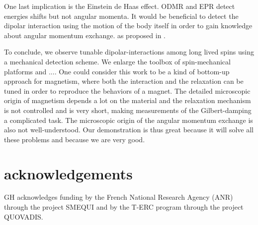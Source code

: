 \documentclass[preprintnumbers,amsmath,amssymb,superscriptaddress,twocolumn,showpacs]{revtex4-1}
\begin{document}
One last implication is the Einstein de Haas effect.
ODMR and EPR detect energies shifts but not angular momenta. 
It would be beneficial to detect the dipolar interaction using the motion of the body itself in order to gain knowledge about angular momentum exchange.
as proposed in \cite{Zangara}.

To conclude, we observe tunable dipolar-interactions among long lived spins using a mechanical detection scheme.
We enlarge the toolbox of spin-mechanical platforms and ....
One could consider this work to be a kind of bottom-up approach for magnetism, where both the interaction and the relaxation can be tuned in order to reproduce the behaviors of a magnet. 
The detailed microscopic origin of magnetism depends a lot on the material and the relaxation mechanism is not controlled and is very short, making measurements of the  Gilbert-damping a complicated task.
The microscopic origin of the angular momentum exchange is also not well-understood. 
Our demonstration is thus great because it will solve all these problems and because we are very good.

\section*{acknowledgements}
GH acknowledges funding by the French National Research Agency (ANR) through the project SMEQUI and by the T-ERC program through the project QUOVADIS. 


\end{document}
